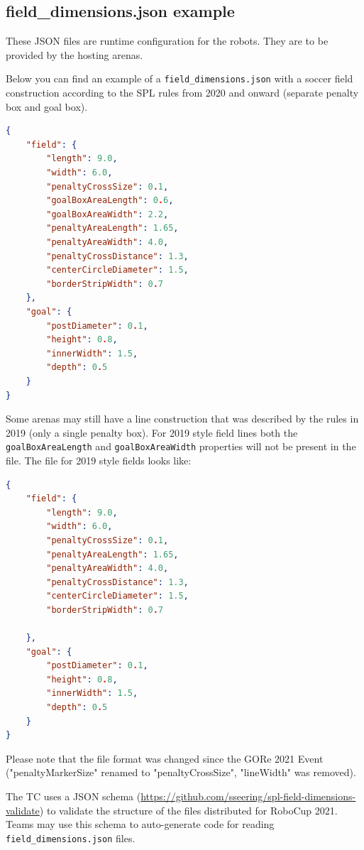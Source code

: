 \subsection{field\_dimensions.json example}
\label{sec:fielddimensionsjson}

These JSON files are runtime configuration for the robots. They are to be provided by the hosting arenas.

Below you can find an example of a \texttt{field\_dimensions.json} with a soccer field construction according to the SPL rules from 2020 and onward (separate penalty box and goal box).

\begin{lstlisting}[language=json,firstnumber=1]
{
    "field": {
        "length": 9.0,
        "width": 6.0,
        "penaltyCrossSize": 0.1,
        "goalBoxAreaLength": 0.6,
        "goalBoxAreaWidth": 2.2,
        "penaltyAreaLength": 1.65,
        "penaltyAreaWidth": 4.0,
        "penaltyCrossDistance": 1.3,
        "centerCircleDiameter": 1.5,
        "borderStripWidth": 0.7
    },
    "goal": {
        "postDiameter": 0.1,
        "height": 0.8,
        "innerWidth": 1.5,
        "depth": 0.5
    }
}
\end{lstlisting}

Some arenas may still have a line construction that was described by the rules in 2019 (only a single penalty box). For 2019 style field lines both the \texttt{goalBoxAreaLength} and \texttt{goalBoxAreaWidth} properties will not be present in the file. The file for 2019 style fields looks like:

\begin{lstlisting}[language=json,firstnumber=1]
{
    "field": {
        "length": 9.0,
        "width": 6.0,
        "penaltyCrossSize": 0.1,
        "penaltyAreaLength": 1.65,
        "penaltyAreaWidth": 4.0,
        "penaltyCrossDistance": 1.3,
        "centerCircleDiameter": 1.5,
        "borderStripWidth": 0.7

    },
    "goal": {
        "postDiameter": 0.1,
        "height": 0.8,
        "innerWidth": 1.5,
        "depth": 0.5
    }
}
\end{lstlisting}

Please note that the file format was changed since the GORe 2021 Event ("penaltyMarkerSize" renamed to "penaltyCrossSize", "lineWidth" was removed).

The TC uses a JSON schema (\url{https://github.com/sseering/spl-field-dimensions-validate}) to validate the structure of the files distributed for RoboCup 2021. Teams may use this schema to auto-generate code for reading \texttt{field\_dimensions.json} files.
